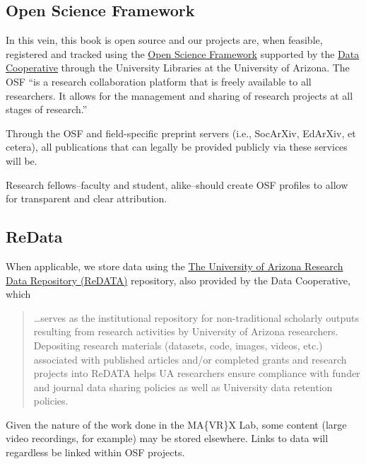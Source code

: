 \documentclass[
]{book}
\begin{document}
\hypertarget{open-science-framework}{%
\subsection{Open Science Framework}\label{open-science-framework}}

In this vein, this book is open source and our projects are, when feasible, registered and tracked using the \href{https://osf.io}{Open Science Framework} supported by the \href{https://data.library.arizona.edu/data-management/services/open-science-framework-osf}{Data Cooperative} through the University Libraries at the University of Arizona. The OSF ``is a research collaboration platform that is freely available to all researchers. It allows for the management and sharing of research projects at all stages of research.''

Through the OSF and field-specific preprint servers (i.e., SocArXiv, EdArXiv, et cetera), all publications that can legally be provided publicly via these services will be.

Research fellows--faculty and student, alike--should create OSF profiles to allow for transparent and clear attribution.

\hypertarget{redata}{%
\subsection{ReData}\label{redata}}

When applicable, we store data using the \href{https://data.library.arizona.edu/data-management/services/research-data-repository-redata}{The University of Arizona Research Data Repository (ReDATA)} repository, also provided by the Data Cooperative, which

\begin{quote}
\ldots serves as the institutional repository for non-traditional scholarly outputs resulting from research activities by University of Arizona researchers. Depositing research materials (datasets, code, images, videos, etc.) associated with published articles and/or completed grants and research projects into ReDATA helps UA researchers ensure compliance with funder and journal data sharing policies as well as University data retention policies.
\end{quote}

Given the nature of the work done in the MA\{VR\}X Lab, some content (large video recordings, for example) may be stored elsewhere. Links to data will regardless be linked within OSF projects.
\end{document}
